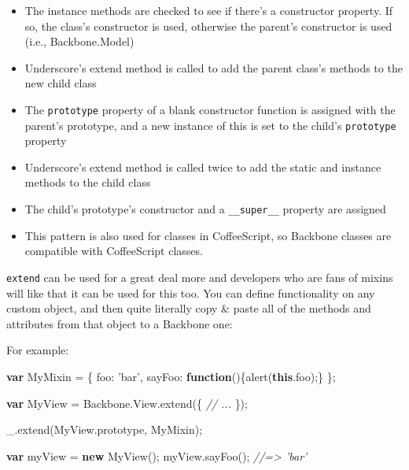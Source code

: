 \documentclass[9pt]{book}
\newenvironment{Shaded}{}{}
\newcommand{\KeywordTok}[1]{\textcolor[rgb]{0.00,0.44,0.13}{\textbf{{#1}}}}
\newcommand{\DataTypeTok}[1]{\textcolor[rgb]{0.56,0.13,0.00}{{#1}}}
\newcommand{\StringTok}[1]{\textcolor[rgb]{0.25,0.44,0.63}{{#1}}}
\newcommand{\CommentTok}[1]{\textcolor[rgb]{0.38,0.63,0.69}{\textit{{#1}}}}
\newcommand{\OtherTok}[1]{\textcolor[rgb]{0.00,0.44,0.13}{{#1}}}
\newcommand{\FunctionTok}[1]{\textcolor[rgb]{0.02,0.16,0.49}{{#1}}}
\newcommand{\NormalTok}[1]{{#1}}
\begin{document}
\begin{itemize}
\itemsep1pt\parskip0pt
\item
  The instance methods are checked to see if there's a constructor
  property. If so, the class's constructor is used, otherwise the
  parent's constructor is used (i.e., Backbone.Model)
\item
  Underscore's extend method is called to add the parent class's methods
  to the new child class
\item
  The \texttt{prototype} property of a blank constructor function is
  assigned with the parent's prototype, and a new instance of this is
  set to the child's \texttt{prototype} property
\item
  Underscore's extend method is called twice to add the static and
  instance methods to the child class
\item
  The child's prototype's constructor and a \texttt{\_\_super\_\_}
  property are assigned
\item
  This pattern is also used for classes in CoffeeScript, so Backbone
  classes are compatible with CoffeeScript classes.
\end{itemize}

\texttt{extend} can be used for a great deal more and developers who are
fans of mixins will like that it can be used for this too. You can
define functionality on any custom object, and then quite literally copy
\& paste all of the methods and attributes from that object to a
Backbone one:

For example:

\begin{Shaded}
\begin{Highlighting}[]
\KeywordTok{var} \NormalTok{MyMixin = \{}
  \DataTypeTok{foo}\NormalTok{: }\StringTok{'bar'}\NormalTok{,}
  \DataTypeTok{sayFoo}\NormalTok{: }\KeywordTok{function}\NormalTok{()\{}\FunctionTok{alert}\NormalTok{(}\KeywordTok{this}\NormalTok{.}\FunctionTok{foo}\NormalTok{);\}}
\NormalTok{\};}

\KeywordTok{var} \NormalTok{MyView = }\OtherTok{Backbone}\NormalTok{.}\OtherTok{View}\NormalTok{.}\FunctionTok{extend}\NormalTok{(\{}
 \CommentTok{// ...}
\NormalTok{\});}

\OtherTok{_}\NormalTok{.}\FunctionTok{extend}\NormalTok{(}\OtherTok{MyView}\NormalTok{.}\FunctionTok{prototype}\NormalTok{, MyMixin);}

\KeywordTok{var} \NormalTok{myView = }\KeywordTok{new} \FunctionTok{MyView}\NormalTok{();}
\OtherTok{myView}\NormalTok{.}\FunctionTok{sayFoo}\NormalTok{(); }\CommentTok{//=> 'bar'}
\end{Highlighting}
\end{Shaded}
\end{document}
